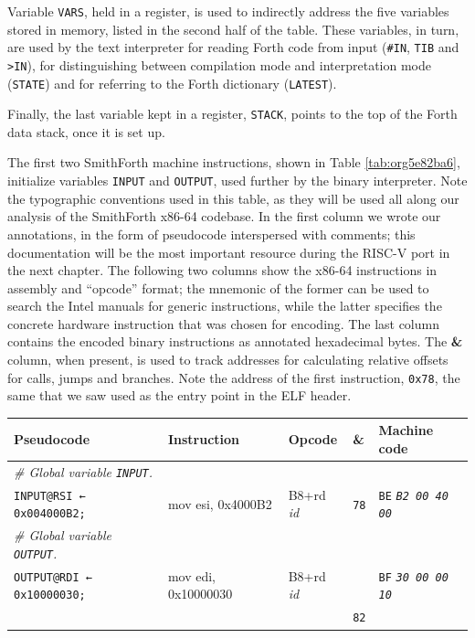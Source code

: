 \documentclass[a4paper,12pt,final]{article}
\begin{document}
Variable \texttt{VARS}, held in a register, is used to indirectly address the
five variables stored in memory, listed in the second half of the
table. These variables, in turn, are used by the text interpreter for
reading Forth code from input (\texttt{\#IN}, \texttt{TIB} and \texttt{>IN}), for
distinguishing between compilation mode and interpretation mode
(\texttt{STATE}) and for referring to the Forth dictionary (\texttt{LATEST}).

Finally, the last variable kept in a register, \texttt{STACK}, points to the
top of the Forth data stack, once it is set up.

The first two SmithForth machine instructions, shown in Table
\ref{tab:org5e82ba6}, initialize variables \texttt{INPUT} and \texttt{OUTPUT}, used
further by the binary interpreter.  Note the typographic conventions
used in this table, as they will be used all along our analysis of the
SmithForth x86-64 codebase.  In the first column we wrote our
annotations, in the form of pseudocode interspersed with comments;
this documentation will be the most important resource during the
RISC-V port in the next chapter.  The following two columns show the
x86-64 instructions in assembly and ``opcode'' format; the mnemonic of
the former can be used to search the Intel manuals for generic
instructions, while the latter specifies the concrete hardware
instruction that was chosen for encoding.  The last column contains
the encoded binary instructions as annotated hexadecimal bytes.  The
\textbf{\&} column, when present, is used to track addresses for calculating
relative offsets for calls, jumps and branches.  Note the address of
the first instruction, \texttt{0x78}, the same that we saw used as the entry
point in the ELF header.

\begin{table}[!htbp] \begin{adjustwidth}{-1cm}{-1cm} \fontsize{10}{12.000000}\selectfont
\begin{center}
\begin{tabular}{l|ll|l|l}
\textbf{Pseudocode} & \textbf{Instruction} & \textbf{Opcode} & \textbf{\&} & \textbf{Machine code}\\[0pt]
\hline
\emph{\# Global variable \texttt{INPUT}.} &  &  &  & \\[0pt]
\texttt{INPUT@RSI ← 0x004000B2;} & mov esi, 0x4000B2 & B8+rd \emph{id} & \texttt{78} & \texttt{BE} \emph{\texttt{B2 00 40 00}}\\[0pt]
\emph{\# Global variable \texttt{OUTPUT}.} &  &  &  & \\[0pt]
\texttt{OUTPUT@RDI ← 0x10000030;} & mov edi, 0x10000030 & B8+rd \emph{id} &  & \texttt{BF} \emph{\texttt{30 00 00 10}}\\[0pt]
 &  &  & \texttt{82} & \\[0pt]
\end{tabular}

\end{center}
\normalsize \end{adjustwidth} \end{table} \vspace{0}
\end{document}
